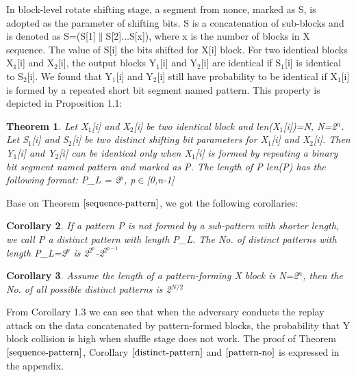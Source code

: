 \documentclass{article}
\newtheorem{theorem}{Theorem}[section]
\newtheorem{corollary}[theorem]{Corollary}
\begin{document}
In block-level rotate shifting stage, a segment from nonce, marked as S, is adopted as the parameter of shifting bits. S is a concatenation of sub-blocks and is denoted as S=(S[1]$\|$S[2]$\ldots$S[x]), where x is the number of blocks in X sequence. The value of S[i] the bits shifted for X[i] block.
For two identical blocks X$_1$[i] and X$_2$[i], the output blocks Y$_1$[i] and Y$_2$[i] are identical if S$_1$[i] is identical to S$_2$[i]. We found that Y$_1$[i] and Y$_2$[i] still have probability to be identical if X$_1$[i] is formed by a repeated short bit segment named pattern. This property is depicted in Proposition 1.1:
\begin{theorem}
Let X$_1$[i] and X$_2$[i] be two identical block and len(X$_1$[i])=N, N=2$^n$. Let S$_1$[i] and S$_2$[i] be two distinct shifting bit parameters for X$_1$[i] and X$_2$[i].
Then Y$_1$[i] and Y$_2$[i] can be identical only when X$_1$[i] is formed by repeating a binary bit segment named pattern and marked as P. The length of P len(P) has the following format:
	P\_L = 2$^p$, p$\in$[0,n-1]
\label{sequence-pattern}
\end{theorem}
Base on Theorem $\ref{sequence-pattern}$, we got the following corollaries:
\begin{corollary}
If a pattern P is not formed by a sub-pattern with shorter length, we call P a distinct pattern with length P\_L. The No. of distinct patterns with length P\_L=2$^p$ is 2$^{2^p}$-2$^{2^{p-1}}$
\label{distinct-pattern}
\end{corollary}
\begin{corollary}
Assume the length of a pattern-forming X block is N=2$^n$, then the No. of all possible distinct patterns is 2$^{N/2}$
\label{pattern-no}
\end{corollary}

From Corollary 1.3 we can see that when the adversary conducts the replay attack on the data concatenated by pattern-formed blocks, the probability that Y block collision is high when shuffle stage does not work. The proof of Theorem $\ref{sequence-pattern}$, Corollary $\ref{distinct-pattern}$ and $\ref{pattern-no}$ is expressed in the appendix. 
\end{document}
